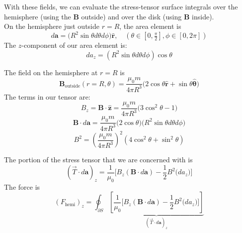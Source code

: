 \documentclass[a4paper,12pt]{article} %
\begin{document}
With these fields, we can evaluate the stress-tensor surface integrals over the hemisphere (using the $\mathbf{B}$ outside) and over the disk (using $\mathbf{B}$ inside).\\

On the hemisphere just outside $r=R$, the area element is
$$d\mathbf{a}=\big(R^2\sin\theta d\theta d\phi\big)\hat{\mathbf{r}},\quad(\theta \in [0,\tfrac{\pi}{2}],\phi \in [0,2\pi])
$$
The $z$-component of our area element is:
$$
d a_z=(R^2\sin\theta d\theta d\phi)\cos\theta
$$

\noindent
The field on the hemisphere at $r=R$ is 
$$
\mathbf{B}_{\text{outside}}(r=R,\theta)=\frac{\mu_0m}{4\pi R^3}\Big(2\cos\theta\hat{\mathbf{r}}+\sin\theta \hat{\boldsymbol{\theta}}\Big)
$$
The terms in our tensor are:
$$
\boxed{B_z =\mathbf{B}\cdot \hat{\mathbf{z}}=\frac{\mu_0m}{4\pi R^3}\big(3\cos^2\theta -1\big)}
$$
$$
\boxed{\mathbf{B}\cdot d\mathbf{a}=\frac{\mu_0m}{4\pi R^3}
\big(2\cos\theta\big)\big(R^2\sin\theta d\theta d\phi\big)}
$$
$$
\boxed{B^2=\left(\frac{\mu_0m}{4\pi R^3}\right)^2\left(4\cos^2\theta + \sin^2\theta\right)}
$$

The portion of the stress tensor that we are concerned with is 
$$
(\overrightarrow{T} \cdot d\mathbf{a})_z=\frac{1}{\mu_0}\Big[B_z(\mathbf{B}\cdot d\mathbf{a})-\frac12 B^2 \big(d a_z\big)
\Big]
$$
The force is
$$
(F_{\text{hemi}})_z=\oint_{\partial S} \underbrace{\left[\frac{1}{\mu_0}\Big[B_z(\mathbf{B}\cdot d\mathbf{a})-\frac12 B^2 \big(d a_z\big)
\Big]\right]}_{(\overrightarrow{T} \cdot d\mathbf{a})_z}
$$
\end{document}

